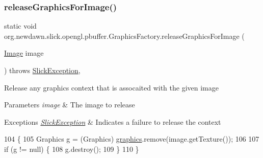 \subsubsection{\texorpdfstring{release\+Graphics\+For\+Image()}{releaseGraphicsForImage()}}
{\footnotesize\ttfamily static void org.\+newdawn.\+slick.\+opengl.\+pbuffer.\+Graphics\+Factory.\+release\+Graphics\+For\+Image (\begin{DoxyParamCaption}\item[{\mbox{\hyperlink{classorg_1_1newdawn_1_1slick_1_1_image}{Image}}}]{image }\end{DoxyParamCaption}) throws \mbox{\hyperlink{classorg_1_1newdawn_1_1slick_1_1_slick_exception}{Slick\+Exception}}\hspace{0.3cm}{\ttfamily [inline]}, {\ttfamily [static]}}

Release any graphics context that is assocaited with the given image


\begin{DoxyParams}{Parameters}
{\em image} & The image to release \\
\hline
\end{DoxyParams}

\begin{DoxyExceptions}{Exceptions}
{\em \mbox{\hyperlink{classorg_1_1newdawn_1_1slick_1_1_slick_exception}{Slick\+Exception}}} & Indicates a failure to release the context \\
\hline
\end{DoxyExceptions}

\begin{DoxyCode}
104                                                                                   \{
105         Graphics g = (Graphics) \mbox{\hyperlink{classorg_1_1newdawn_1_1slick_1_1opengl_1_1pbuffer_1_1_graphics_factory_a782fd785834bb20f7159acf00db88712}{graphics}}.remove(image.getTexture());
106         
107         \textcolor{keywordflow}{if} (g != null) \{
108             g.destroy();
109         \}
110     \}
\end{DoxyCode}
\mbox{\label{classorg_1_1newdawn_1_1slick_1_1opengl_1_1pbuffer_1_1_graphics_factory_aff9664944bc477fc362c607ec842d9ec}} 
